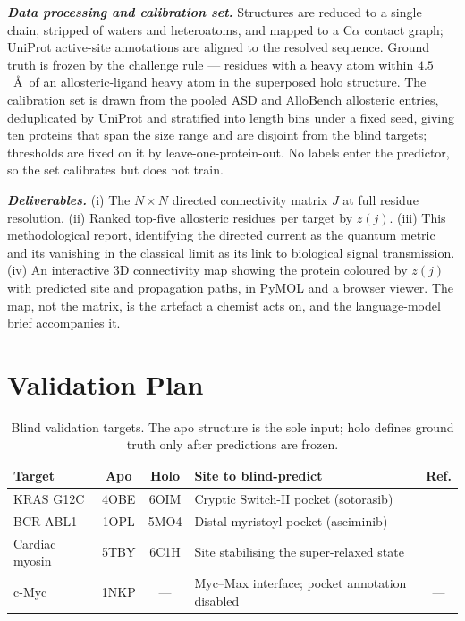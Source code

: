 \documentclass[10pt,a4paper]{article}
\newcommand{\lead}[1]{\textbf{\textit{#1}}}
\begin{document}
\lead{Data processing and calibration set.} Structures are reduced to a single chain, stripped of
waters and heteroatoms, and mapped to a C$\alpha$ contact graph; UniProt active-site annotations are
aligned to the resolved sequence. Ground truth is frozen by the challenge rule --- residues with a
heavy atom within $4.5$~\AA\ of an allosteric-ligand heavy atom in the superposed holo structure. The
calibration set is drawn from the pooled ASD and AlloBench allosteric entries, deduplicated by UniProt
and stratified into length bins under a fixed seed, giving ten proteins that span the size range and
are disjoint from the blind targets; thresholds are fixed on it by leave-one-protein-out. No labels
enter the predictor, so the set calibrates but does not train.

\lead{Deliverables.} (i) The $N\times N$ directed connectivity matrix $J$ at full residue resolution.
(ii) Ranked top-five allosteric residues per target by $z(j)$. (iii) This methodological report,
identifying the directed current as the quantum metric and its vanishing in the classical limit as
its link to biological signal transmission. (iv) An interactive 3D connectivity map showing the protein
coloured by $z(j)$ with predicted site and propagation paths, in PyMOL and a browser viewer. The map,
not the matrix, is the artefact a chemist acts on, and the language-model brief accompanies it.

\section{Validation Plan}

\begin{table}[t]
\caption{Blind validation targets. The apo structure is the sole input; holo defines ground truth
only after predictions are frozen.}
\small
\begin{tabularx}{\textwidth}{@{}lcclc@{}}
\toprule
\textbf{Target} & \textbf{Apo} & \textbf{Holo} & \textbf{Site to blind-predict} & \textbf{Ref.}\\
\midrule
KRAS G12C       & 4OBE & 6OIM & Cryptic Switch-II pocket (sotorasib)            & \cite{ostrem2013}\\
BCR-ABL1        & 1OPL & 5MO4 & Distal myristoyl pocket (asciminib)             & \cite{wylie2017}\\
Cardiac myosin  & 5TBY & 6C1H & Site stabilising the super-relaxed state        & \cite{anderson2018}\\
c-Myc           & 1NKP & ---  & Myc--Max interface; pocket annotation disabled  & ---\\
\bottomrule
\end{tabularx}
\end{table}
\end{document}
